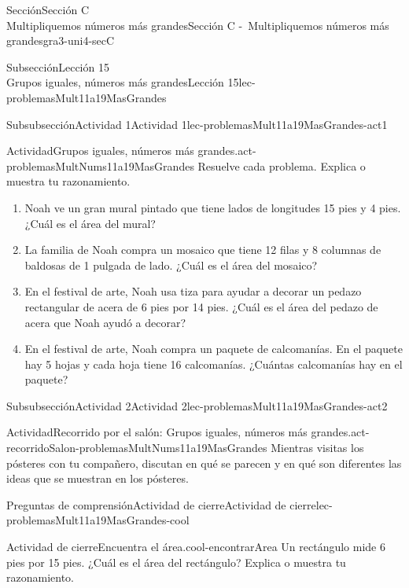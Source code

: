\begin{sectionptx}{Sección}{{\Large Sección C\\}Multipliquemos números más grandes}{}{Sección C -~Multipliquemos números más grandes}{}{}{gra3-uni4-secC}
\begin{subsectionptx}{Subsección}{{\normalsize Lección 15\\[-0.05cm]}Grupos iguales, números más grandes}{}{Lección 15}{}{}{lec-problemasMult11a19MasGrandes}
\begin{subsubsectionptx}{Subsubsección}{Actividad 1}{}{Actividad 1}{}{}{lec-problemasMult11a19MasGrandes-act1}
\begin{activity}{Actividad}{Grupos iguales, números más grandes.}{act-problemasMultNums11a19MasGrandes}%
Resuelve cada problema. Explica o muestra tu razonamiento.%
%
\begin{enumerate}
\item{}Noah ve un gran mural pintado que tiene lados de longitudes 15 pies y 4 pies. ¿Cuál es el área del mural?%
\item{}La familia de Noah compra un mosaico que tiene 12 filas y 8 columnas de baldosas de 1 pulgada de lado. ¿Cuál es el área del mosaico?%
\item{}En el festival de arte, Noah usa tiza para ayudar a decorar un pedazo rectangular de acera de 6 pies por 14 pies. ¿Cuál es el área del pedazo de acera que Noah ayudó a decorar?%
\item{}En el festival de arte, Noah compra un paquete de calcomanías. En el paquete hay 5 hojas y cada hoja tiene 16 calcomanías. ¿Cuántas calcomanías hay en el paquete?%
\end{enumerate}
\end{activity}%
\end{subsubsectionptx}
%
%
\typeout{************************************************}
\typeout{************************************************}
%
\begin{subsubsectionptx}{Subsubsección}{Actividad 2}{}{Actividad 2}{}{}{lec-problemasMult11a19MasGrandes-act2}
\begin{activity}{Actividad}{Recorrido por el salón: Grupos iguales, números más grandes.}{act-recorridoSalon-problemasMultNums11a19MasGrandes}%
Mientras visitas los pósteres con tu compañero, discutan en qué se parecen y en qué son diferentes las ideas que se muestran en los pósteres.%
\end{activity}%
\end{subsubsectionptx}
%
%
\typeout{************************************************}
\typeout{************************************************}
%
\begin{reading-questions-subsubsection}{Preguntas de comprensión}{Actividad de cierre}{}{Actividad de cierre}{}{}{lec-problemasMult11a19MasGrandes-cool}
\begin{project}{Actividad de cierre}{Encuentra el área.}{cool-encontrarArea}%
Un rectángulo mide 6 pies por 15 pies. ¿Cuál es el área del rectángulo? Explica o muestra tu razonamiento.%
\end{project}%

\end{reading-questions-subsubsection}
\end{subsectionptx}
\end{sectionptx}
